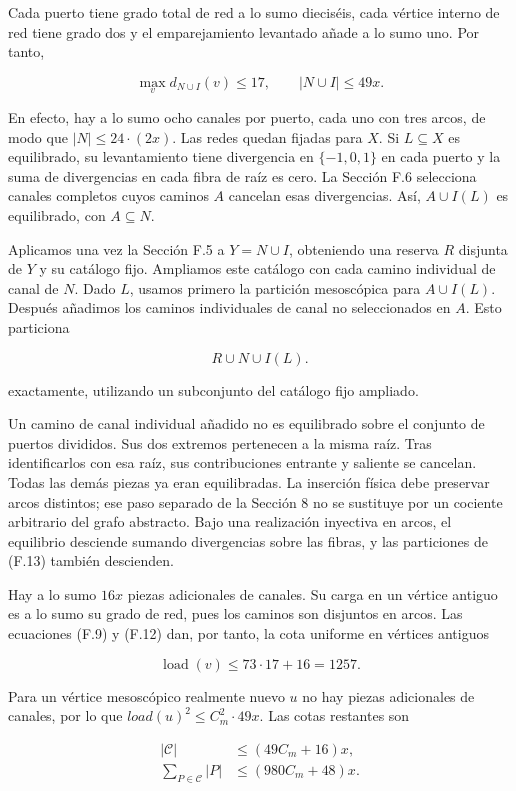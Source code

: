 \documentclass[spanish,11pt,a4paper]{article}
\begin{document}
Cada puerto tiene grado total de red a lo sumo dieciséis, cada vértice interno de red tiene grado dos y el emparejamiento levantado añade a lo sumo uno. Por tanto,

\[\max_v d_{N\cup I}(v)\le17,\qquad |N\cup I|\le49x.\tag{F.12}\]

En efecto, hay a lo sumo ocho canales por puerto, cada uno con tres arcos, de modo que \(|N|\le 24\cdot (2x)\). Las redes quedan fijadas para \(X\). Si \(L\subseteq X\) es equilibrado, su levantamiento tiene divergencia en \(\{-1,0,1\}\) en cada puerto y la suma de divergencias en cada fibra de raíz es cero. La Sección F.6 selecciona canales completos cuyos caminos \(A\) cancelan esas divergencias. Así, \(A\cup I(L)\) es equilibrado, con \(A\subseteq N\).

Aplicamos una vez la Sección F.5 a \(Y=N\cup I\), obteniendo una reserva \(R\) disjunta de \(Y\) y su catálogo fijo. Ampliamos este catálogo con cada camino individual de canal de \(N\). Dado \(L\), usamos primero la partición mesoscópica para \(A\cup I(L)\). Después añadimos los caminos individuales de canal no seleccionados en \(A\). Esto particiona

\[R\cup N\cup I(L).\tag{F.13}\]

exactamente, utilizando un subconjunto del catálogo fijo ampliado.

Un camino de canal individual añadido no es equilibrado sobre el conjunto de puertos divididos. Sus dos extremos pertenecen a la misma raíz. Tras identificarlos con esa raíz, sus contribuciones entrante y saliente se cancelan. Todas las demás piezas ya eran equilibradas. La inserción física debe preservar arcos distintos; ese paso separado de la Sección 8 no se sustituye por un cociente arbitrario del grafo abstracto. Bajo una realización inyectiva en arcos, el equilibrio desciende sumando divergencias sobre las fibras, y las particiones de (F.13) también descienden.

Hay a lo sumo \(16x\) piezas adicionales de canales. Su carga en un vértice antiguo es a lo sumo su grado de red, pues los caminos son disjuntos en arcos. Las ecuaciones (F.9) y (F.12) dan, por tanto, la cota uniforme en vértices antiguos

\[\operatorname{load}(v)\le73\cdot17+16=1257.\tag{F.14}\]

Para un vértice mesoscópico realmente nuevo \(u\) no hay piezas adicionales de canales, por lo que \(load(u)^{2}\le C_{m}^{2}\cdot 49x\). Las cotas restantes son

\[\begin{aligned}|\mathcal C|&\le(49C_m+16)x,\\\sum_{P\in\mathcal C}|P|&\le(980C_m+48)x.\end{aligned}\tag{F.15}\]
\end{document}
